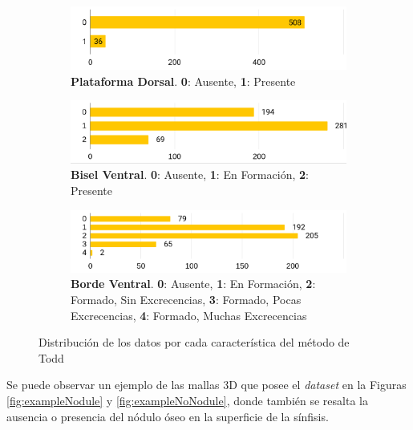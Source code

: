 \begin{figure}[h]
    \ContinuedFloat
\begin{subfigure}{\textwidth}
    \centering
    \includegraphics[width=\linewidth]{imagenes/methods/7_plataformaDorsal.png}
    \caption[Distribución de Plataforma Dorsal en datos]{\textbf{Plataforma Dorsal}. \textbf{0}: Ausente, \textbf{1}: Presente}
    \label{fig:todd7}
\end{subfigure}
\begin{subfigure}{\textwidth}
    \centering
    \includegraphics[width=\linewidth]{imagenes/methods/8_biselVentral.png}
    \caption[Distribución de Bisel Ventral en datos]{\textbf{Bisel Ventral}. \textbf{0}: Ausente, \textbf{1}: En Formación, \textbf{2}: Presente}
    \label{fig:todd8}
\end{subfigure}
\begin{subfigure}{\textwidth}
    \centering
    \includegraphics[width=\linewidth]{imagenes/methods/9_bordeVentral.png}
    \caption[Distribución de Borde Ventral en datos]{\textbf{Borde Ventral}. \textbf{0}: Ausente, \textbf{1}: En Formación, \textbf{2}: Formado, Sin Excrecencias, \textbf{3}: Formado, Pocas Excrecencias, \textbf{4}: Formado, Muchas Excrecencias}
    \label{fig:todd9}
\end{subfigure}
\caption{Distribución de los datos por cada característica del método de Todd}
\end{figure}

Se puede observar un ejemplo de las mallas 3D que posee el \textit{dataset} en la Figuras \ref{fig:exampleNodule} y \ref{fig:exampleNoNodule}, donde también se resalta la ausencia o presencia del nódulo óseo en la superficie de la sínfisis.

